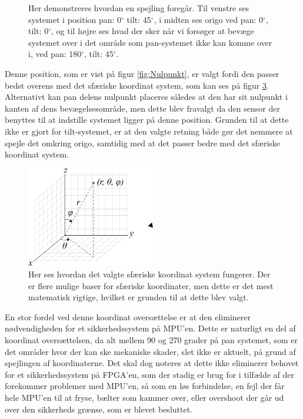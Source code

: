 \begin{figure}[!h]
\begin{subfigure}[b]{0.3\textwidth}
        \caption{}
        \label{fig:tilt_spejl}
    \end{subfigure}
   \caption{Her demonstreres hvordan en spejling foregår. Til venstre ses systemet i position pan: 0$^{\circ}$ tilt: 45$^{\circ}$, i midten ses origo ved pan: 0$^{\circ}$, tilt: 0$^{\circ}$, og til højre ses hvad der sker når vi forsøger at bevæge systemet over i det område som pan-systemet ikke kan komme over i, ved pan: 180$^{\circ}$, tilt: 45$^{\circ}$.}
\end{figure}

Denne position, som er vist på figur \ref{fig:Nulpunkt}, er valgt fordi den passer bedst overens med det sfæriske koordinat system, som kan ses på figur \ref{fig:Spherical}. Alternativt kan pan delens nulpunkt placeres således at den har sit nulpunkt i kanten af dens bevægelsesområde, men dette blev fravalgt da den sensor der benyttes til at indstille systemet ligger på denne position. Grunden til at dette ikke er gjort for tilt-systemet, er at den valgte retning både gør det nemmere at spejle det omkring origo, samtidig med at det passer bedre med det sfæriske koordinat system.

\begin{figure}[!hb]
	\begin{center}
		\includegraphics[width=0.5\textwidth]{Billeder/Spherical.png}
	\end{center}		
	\caption{Her ses hvordan det valgte sfæriske koordinat system fungerer. Der er flere mulige baser for sfæriske koordinater, men dette er det mest matematisk rigtige, hvilket er grunden til at dette blev valgt.}
	\label{fig:Spherical}
\end{figure}
En stor fordel ved denne koordinat oversættelse er at den eliminerer nødvendigheden for et sikkerhedssystem på MPU'en. Dette er naturligt en del af koordinat oversættelsen, da alt mellem 90 og 270 grader på pan systemet, som er det områder hvor der kan ske mekaniske skader, slet ikke er aktuelt, på grund af spejlingen af koordinaterne. Det skal dog noteres at dette ikke eliminerer behovet for et sikkerhedssystem på FPGA'en, som der stadig er brug for i tilfælde af der forekommer problemer med MPU'en, så som en løs forbindelse, en fejl der får hele MPU'en til at fryse, bælter som kammer over, eller overshoot der går ud over den sikkerheds grænse, som er blevet besluttet.





















